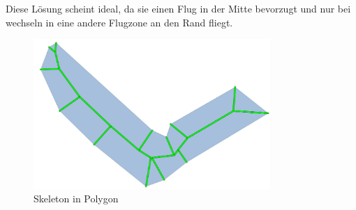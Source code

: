 Diese Lösung scheint ideal, da sie einen Flug in der Mitte bevorzugt und nur bei wechseln in eine andere Flugzone an den Rand fliegt.

\begin{figure}[H]
	\centering
	\includegraphics[width=0.8\textwidth]{images/routing/skeleton.png}
	\caption{Skeleton in Polygon}
	\label{fig:skeleton-in-polygon}
\end{figure}

